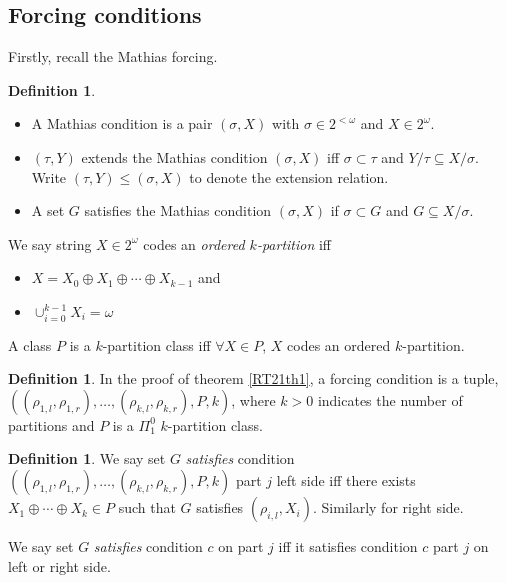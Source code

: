\documentclass[options]{amsart}
\theoremstyle{definition}
\newtheorem{definition}[theorem]{Definition}
\theoremstyle{remark}
\newtheorem{Ramsey's theorem}[theorem]{Ramsey's theorem}
\begin{document}
\subsection{Forcing conditions}\label{RT21subsec-1}
Firstly, recall the Mathias forcing.
\begin{definition}
\label{def1}
\

\begin{itemize}
\item A Mathias condition is a pair $(\sigma,X)$
with $\sigma \in 2^{<\omega}$ and $X \in 2^\omega$.

\item $(\tau,Y)$ extends the Mathias condition $(\sigma,X)$
iff $\sigma \subset \tau$ and $Y/\tau \subseteq X/\sigma$.
Write $(\tau,Y)\leq (\sigma,X) $ to denote
the extension relation.

\item A set $G$ satisfies the Mathias condition
$(\sigma,X)$ if $\sigma \subset G$
 and $G \subseteq X/\sigma$.
\end{itemize}

\end{definition}

We say
string $X\in 2^\omega$ codes an
\emph{ordered $k$-partition} iff
\begin{itemize}
\item $X=X_0\oplus X_1\oplus\cdots\oplus X_{k-1}$ and

\item $\cup_{i=0}^{k-1}X_i=\omega$
\end{itemize}

 A class $P$ is a $k$-partition class iff
  $\forall X\in P$, $X$ codes an ordered $k$-partition.

  \begin{definition}
In the proof of theorem \ref{RT21th1},
a forcing condition is a tuple,
$((\rho_{1,l},\rho_{1,r})
,\ldots,(\rho_{k,l},\rho_{k,r}),P,k)$,
where $k>0$ indicates the
number of partitions
and $P$ is a $\Pi^{0}_1$ $k$-partition class.
\end{definition}

\begin{definition}
\label{def-sat}
We say set
$G$ \emph{satisfies}
condition $((\rho_{1,l},\rho_{1,r})
,\ldots,(\rho_{k,l},\rho_{k,r}),P,k)$
part $j$ left side
iff there exists $X_1 \oplus
\cdots \oplus X_{k} \in P$
such that
$G$ satisfies  $(\rho_{i,l},X_i)$.
Similarly for right side.

We say set $G$ \emph{satisfies}
condition $c$ on part $j$ iff
it satisfies condition $c$ part $j$
on left or right side.
\end{definition}
\end{document}

